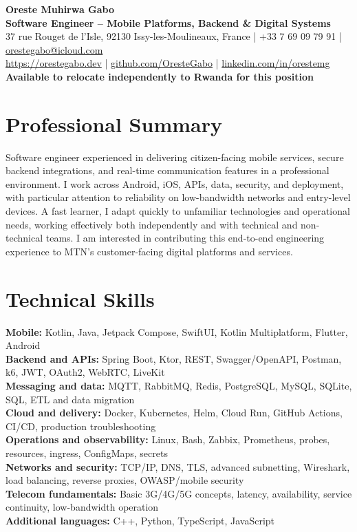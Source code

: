 \documentclass[10pt,a4paper]{article}
\begin{document}
\small

\begin{center}
{\LARGE \textbf{Oreste Muhirwa Gabo}}\\[3pt]
{\Large \textbf{Software Engineer -- Mobile Platforms, Backend \& Digital Systems}}\\[3pt]
37 rue Rouget de l'Isle, 92130 Issy-les-Moulineaux, France
\quad | \quad +33 7 69 09 79 91
\quad | \quad \href{mailto:orestegabo@icloud.com}{orestegabo@icloud.com}\\
\href{https://orestegabo.dev}{https://orestegabo.dev}
\quad | \quad
\href{https://github.com/OresteGabo}{github.com/OresteGabo}
\quad | \quad
\href{https://www.linkedin.com/in/orestemg/}{linkedin.com/in/orestemg}\\[2pt]
\textbf{Available to relocate independently to Rwanda for this position}
\end{center}

\section{Professional Summary}
Software engineer experienced in delivering citizen-facing mobile services, secure backend integrations, and real-time communication features in a professional environment. I work across Android, iOS, APIs, data, security, and deployment, with particular attention to reliability on low-bandwidth networks and entry-level devices. A fast learner, I adapt quickly to unfamiliar technologies and operational needs, working effectively both independently and with technical and non-technical teams. I am interested in contributing this end-to-end engineering experience to MTN's customer-facing digital platforms and services.

\section{Technical Skills}
\textbf{Mobile:} Kotlin, Java, Jetpack Compose, SwiftUI, Kotlin Multiplatform, Flutter, Android \\
\textbf{Backend and APIs:} Spring Boot, Ktor, REST, Swagger/OpenAPI, Postman, k6, JWT, OAuth2, WebRTC, LiveKit \\
\textbf{Messaging and data:} MQTT, RabbitMQ, Redis, PostgreSQL, MySQL, SQLite, SQL, ETL and data migration \\
\textbf{Cloud and delivery:} Docker, Kubernetes, Helm, Cloud Run, GitHub Actions, CI/CD, production troubleshooting \\
\textbf{Operations and observability:} Linux, Bash, Zabbix, Prometheus, probes, resources, ingress, ConfigMaps, secrets \\
\textbf{Networks and security:} TCP/IP, DNS, TLS, advanced subnetting, Wireshark, load balancing, reverse proxies, OWASP/mobile security \\
\textbf{Telecom fundamentals:} Basic 3G/4G/5G concepts, latency, availability, service continuity, low-bandwidth operation \\
\textbf{Additional languages:} C++, Python, TypeScript, JavaScript
\end{document}
